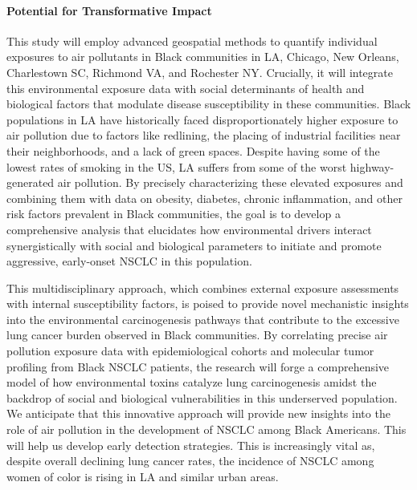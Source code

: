 \paragraph{Potential for Transformative Impact}

This study will employ advanced geospatial methods to quantify individual exposures to air pollutants 
in Black communities in LA, Chicago, New Orleans, Charlestown SC, Richmond VA, and Rochester NY. 
Crucially, it will integrate this environmental exposure data with social determinants of health and biological factors 
that modulate disease susceptibility in these communities. 
Black populations in LA have historically faced disproportionately higher exposure to air pollution 
due to factors like redlining, the placing of industrial facilities near their neighborhoods, and a lack of green spaces. 
Despite having some of the lowest rates of smoking in the US, LA suffers from some of the worst highway-generated air pollution. 
By precisely characterizing these elevated exposures and combining them with data on 
obesity, diabetes, chronic inflammation, and other risk factors prevalent in Black communities, 
the goal is to develop a comprehensive analysis that elucidates how environmental drivers interact synergistically with 
social and biological parameters to initiate and promote aggressive, early-onset NSCLC in this population. 

\vspace{1em}
\noindent
This multidisciplinary approach, which combines external exposure assessments with internal susceptibility factors, 
is poised to provide novel mechanistic insights into the environmental carcinogenesis pathways 
that contribute to the excessive lung cancer burden observed in Black communities. 
By correlating precise air pollution exposure data with epidemiological cohorts and molecular tumor profiling from Black NSCLC patients, 
the research will forge a comprehensive model of how environmental toxins catalyze lung carcinogenesis 
amidst the backdrop of social and biological vulnerabilities in this underserved population. 
We anticipate that this innovative approach will provide new insights into the role of air pollution in 
the development of NSCLC among Black Americans. 
This will help us develop early detection strategies.
This is increasingly vital as, despite overall declining lung cancer rates, 
the incidence of NSCLC among women of color is rising in LA and similar urban areas.
